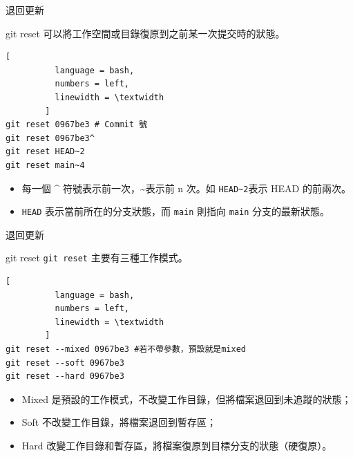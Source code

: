 \documentclass[xetex, unicode, 10pt, aspectratio=169]{beamer}
\begin{document}
\begin{frame}[fragile]{退回更新}
    \begin{block}{git reset}
        可以將工作空間或目錄復原到之前某一次提交時的狀態。
        \begin{lstlisting}[
          language = bash,
          numbers = left,
          linewidth = \textwidth
        ]
git reset 0967be3 # Commit 號
git reset 0967be3^
git reset HEAD~2
git reset main~4\end{lstlisting}
        \pause
        \begin{itemize}
            \item 每⼀個 \^{} 符號表⽰前⼀次，\textasciitilde 表示前 n 次。如
                \texttt{HEAD\textasciitilde 2}表示 HEAD 的前兩次。
            \item \texttt{HEAD} 表示當前所在的分支狀態，而 \texttt{main} 則指向
                \texttt{main} 分支的最新狀態。
        \end{itemize}
    \end{block}
\end{frame}

\begin{frame}[fragile]{退回更新}
    \begin{block}{git reset}
        \texttt{git reset} 主要有三種工作模式。
        \begin{lstlisting}[
          language = bash,
          numbers = left,
          linewidth = \textwidth
        ]
git reset --mixed 0967be3 #若不帶參數，預設就是mixed
git reset --soft 0967be3
git reset --hard 0967be3\end{lstlisting}
        \pause
        \begin{itemize}
            \item Mixed 是預設的工作模式，不改變工作目錄，但將檔案退回到未追蹤的狀態；
            \item Soft 不改變工作目錄，將檔案退回到暫存區；
            \item Hard 改變工作目錄和暫存區，將檔案復原到目標分支的狀態（硬復原）。
        \end{itemize}
    \end{block}
\end{frame}
\end{document}
